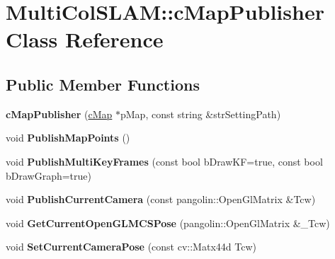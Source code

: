 \hypertarget{classMultiColSLAM_1_1cMapPublisher}{}\section{Multi\+Col\+S\+L\+AM\+:\+:c\+Map\+Publisher Class Reference}
\label{classMultiColSLAM_1_1cMapPublisher}
\subsection*{Public Member Functions}
\begin{DoxyCompactItemize}
\item 
{\bfseries c\+Map\+Publisher} (\hyperlink{classMultiColSLAM_1_1cMap}{c\+Map} $\ast$p\+Map, const string \&str\+Setting\+Path)\hypertarget{classMultiColSLAM_1_1cMapPublisher_af8c18b7f1f5fc061399e7ae0ac1f24e3}{}\label{classMultiColSLAM_1_1cMapPublisher_af8c18b7f1f5fc061399e7ae0ac1f24e3}

\item 
void {\bfseries Publish\+Map\+Points} ()\hypertarget{classMultiColSLAM_1_1cMapPublisher_a4b0740b326e09680caa616a52ef02295}{}\label{classMultiColSLAM_1_1cMapPublisher_a4b0740b326e09680caa616a52ef02295}

\item 
void {\bfseries Publish\+Multi\+Key\+Frames} (const bool b\+Draw\+KF=true, const bool b\+Draw\+Graph=true)\hypertarget{classMultiColSLAM_1_1cMapPublisher_a14d5e09d38485cb393ee25c7deef5583}{}\label{classMultiColSLAM_1_1cMapPublisher_a14d5e09d38485cb393ee25c7deef5583}

\item 
void {\bfseries Publish\+Current\+Camera} (const pangolin\+::\+Open\+Gl\+Matrix \&Tcw)\hypertarget{classMultiColSLAM_1_1cMapPublisher_af7475f673f106d034392bd70a9dba885}{}\label{classMultiColSLAM_1_1cMapPublisher_af7475f673f106d034392bd70a9dba885}

\item 
void {\bfseries Get\+Current\+Open\+G\+L\+M\+C\+S\+Pose} (pangolin\+::\+Open\+Gl\+Matrix \&\+\_\+\+Tcw)\hypertarget{classMultiColSLAM_1_1cMapPublisher_a7b1b6fab4bfbe2d632456c054942000b}{}\label{classMultiColSLAM_1_1cMapPublisher_a7b1b6fab4bfbe2d632456c054942000b}

\item 
void {\bfseries Set\+Current\+Camera\+Pose} (const cv\+::\+Matx44d Tcw)\hypertarget{classMultiColSLAM_1_1cMapPublisher_a5842836951b1a5e724962376cb6ff3df}{}\label{classMultiColSLAM_1_1cMapPublisher_a5842836951b1a5e724962376cb6ff3df}


\end{DoxyCompactItemize}
